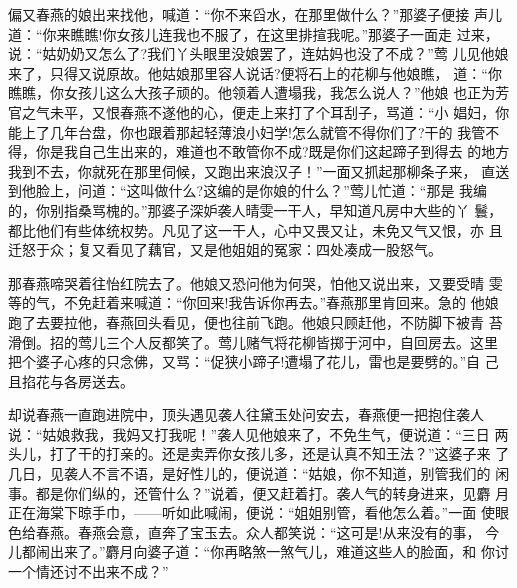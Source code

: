 偏又春燕的娘出来找他，喊道：“你不来舀水，在那里做什么？”那婆子便接
声儿道：“你来瞧瞧!你女孩儿连我也不服了，在这里排揎我呢。”那婆子一面走
过来，说：“姑奶奶又怎么了?我们丫头眼里没娘罢了，连姑妈也没了不成？”莺
儿见他娘来了，只得又说原故。他姑娘那里容人说话?便将石上的花柳与他娘瞧，
道：“你瞧瞧，你女孩儿这么大孩子顽的。他领着人遭塌我，我怎么说人？”他娘
也正为芳官之气未平，又恨春燕不遂他的心，便走上来打了个耳刮子，骂道：“小
娼妇，你能上了几年台盘，你也跟着那起轻薄浪小妇学!怎么就管不得你们了?干的
我管不得，你是我自己生出来的，难道也不敢管你不成?既是你们这起蹄子到得去
的地方我到不去，你就死在那里伺候，又跑出来浪汉子！”一面又抓起那柳条子来，
直送到他脸上，问道：“这叫做什么?这编的是你娘的什么？”莺儿忙道：“那是
我编的，你别指桑骂槐的。”那婆子深妒袭人晴雯一干人，早知道凡房中大些的丫
鬟，都比他们有些体统权势。凡见了这一干人，心中又畏又让，未免又气又恨，亦
且迁怒于众；复又看见了藕官，又是他姐姐的冤家：四处凑成一股怒气。

那春燕啼哭着往怡红院去了。他娘又恐问他为何哭，怕他又说出来，又要受晴
雯等的气，不免赶着来喊道：“你回来!我告诉你再去。”春燕那里肯回来。急的
他娘跑了去要拉他，春燕回头看见，便也往前飞跑。他娘只顾赶他，不防脚下被青
苔滑倒。招的莺儿三个人反都笑了。莺儿赌气将花柳皆掷于河中，自回房去。这里
把个婆子心疼的只念佛，又骂：“促狭小蹄子!遭塌了花儿，雷也是要劈的。”自
己且掐花与各房送去。

却说春燕一直跑进院中，顶头遇见袭人往黛玉处问安去，春燕便一把抱住袭人
说：“姑娘救我，我妈又打我呢！”袭人见他娘来了，不免生气，便说道：“三日
两头儿，打了干的打亲的。还是卖弄你女孩儿多，还是认真不知王法？”这婆子来
了几日，见袭人不言不语，是好性儿的，便说道：“姑娘，你不知道，别管我们的
闲事。都是你们纵的，还管什么？”说着，便又赶着打。袭人气的转身进来，见麝
月正在海棠下晾手巾，——听如此喊闹，便说：“姐姐别管，看他怎么着。”一面
使眼色给春燕。春燕会意，直奔了宝玉去。众人都笑说：“这可是!从来没有的事，
今儿都闹出来了。”麝月向婆子道：“你再略煞一煞气儿，难道这些人的脸面，和
你讨一个情还讨不出来不成？”

